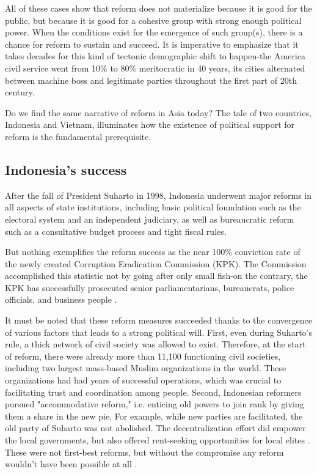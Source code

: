 \documentclass[12pt]{article}
\begin{document}
All of these cases show that reform does not materialize because it is good for the public, but because it is good for a cohesive group with strong enough political power. When the conditions exist for the emergence of such group(s), there is a chance for reform to sustain and succeed. It is imperative to emphasize that it takes decades for this kind of tectonic demographic shift to happen-the America civil service went from 10\% to 80\% meritocratic in 40 years, its cities alternated between machine boss and legitimate parties throughout the first part of 20th century.

Do we find the same narrative of reform in Asia today? The tale of two countries, Indonesia and Vietnam, illuminates how the existence of political support for reform is the fundamental prerequisite.

\subsection{Indonesia's success}
\label{sec:Indonesia}

After the fall of President Suharto in 1998, Indonesia underwent major reforms in all aspects of state institutions, including basic political foundation such as the electoral system and an independent judiciary, as well as bureaucratic reform such as a consultative budget process and tight fiscal rules.

But nothing exemplifies the reform success as the near 100\% conviction rate of the newly created Corruption Eradication Commission (KPK). The Commission accomplished this statistic not by going after only small fish-on the contrary, the KPK has successfully prosecuted senior parliamentarians, bureaucrats, police officials, and business people \citep{Schutte2012}.

It must be noted that these reform measures succeeded thanks to the convergence of various factors that leads to a strong political will. First, even during Suharto's rule, a thick network of civil society was allowed to exist. Therefore, at the start of reform, there were already more than 11,100 functioning civil societies, including two largest mass-based Muslim organizations in the world. These organizations had had years of successful operations, which was crucial to facilitating trust and coordination among people. Second, Indonesian reformers pursued "accommodative reform," i.e. enticing old powers to join rank by giving them a share in the new pie. For example, while new parties are facilitated, the old party of Suharto was not abolished. The decentralization effort did empower the local governments, but also offered rent-seeking opportunities for local elites \citep{Hadiz2004}. These were not first-best reforms, but without the compromise any reform wouldn't have been possible at all \citep{Harris2011}.
\end{document}
